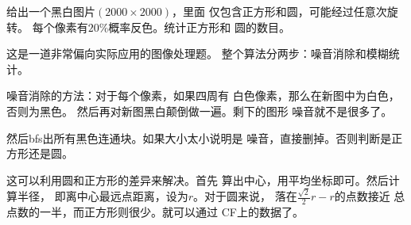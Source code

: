\begin{prob}
	给出一个黑白图片$(2000 \times 2000)$，里面
	仅包含正方形和圆，可能经过任意次旋转。
	每个像素有$20\%$概率反色。统计正方形和
	圆的数目。
\end{prob}

\begin{sol}
	这是一道非常偏向实际应用的图像处理题。
	整个算法分两步：噪音消除和模糊统计。\par
	噪音消除的方法：对于每个像素，如果四周有
	白色像素，那么在新图中为白色，否则为黑色。
	然后再对新图黑白颠倒做一遍。剩下的图形
	噪音就不是很多了。\par
	然后bfs出所有黑色连通块。如果大小太小说明是
	噪音，直接删掉。否则判断是正方形还是圆。\par
	这可以利用圆和正方形的差异来解决。首先
	算出中心，用平均坐标即可。然后计算半径，
	即离中心最远点距离，设为$r$。对于圆来说，
	落在$\frac{\sqrt{2}}{2} r - r$的点数接近
	总点数的一半，而正方形则很少。就可以通过
	CF上的数据了。
\end{sol}
